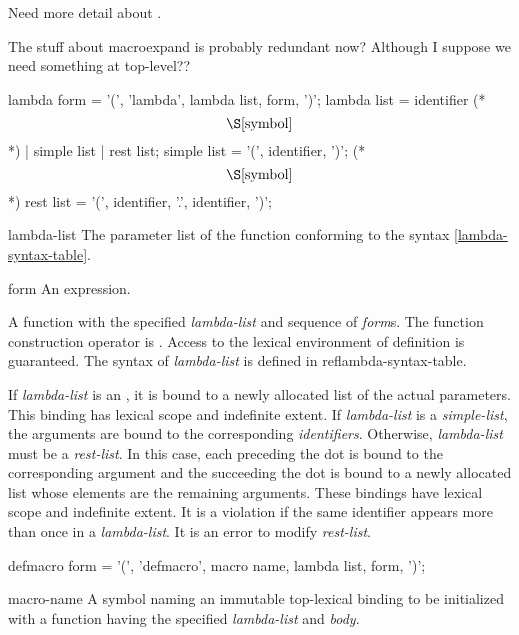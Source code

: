 \label{function}
%
\begin{optPrivate}
    Need more detail about .

    The stuff about macroexpand is probably redundant now?  Although I
    suppose we need something at top-level??
\end{optPrivate}
%
\begin{optDefinition}
%
%
\Syntax
\label{lambda-syntax-table}
\savesyntax\lambdaSyntax\vbox{\syntax
lambda form
   = '(', 'lambda', lambda list, {form}, ')';
lambda list
   = identifier     (* \[\S\ref{symbol}\] *)
   | simple list
   | rest list;
simple list
   = '(', {identifier}, ')';   (* \[\S\ref{symbol}\] *)
rest list
   = '(', {identifier}, '.', identifier, ')';
\endsyntax}
%
\begin{arguments}
    \item[lambda-list] The parameter list of the function conforming to the
    syntax \ref{lambda-syntax-table}.
    \item[form] An expression.
\end{arguments}
%
\result%
A function with the specified {\em lambda-list\/} and sequence of {\em
form\/}s.
%
\remarks%
The function construction operator is .  Access to the
lexical environment of definition is guaranteed.  The syntax of {\em
    lambda-list} is defined in ref{lambda-syntax-table}.

If {\em lambda-list} is an \identifier, it is bound to a newly allocated
list of the actual parameters.  This binding has lexical scope and indefinite extent.  If
{\em lambda-list} is a {\em simple-list}, the arguments are bound to the
corresponding {\em identifiers}.  Otherwise, {\em lambda-list} must be a {\em
    rest-list}.  In this case, each \identifier{} preceding the dot is bound
to the corresponding argument and the \identifier{} succeeding the dot is
bound to a newly allocated list whose elements are the remaining arguments.
These bindings have lexical scope and indefinite extent.  It is a violation
if the same identifier appears more than once in a {\em lambda-list}.  It is an
error to modify {\em rest-list}.

%
\Syntax
\savesyntax{}\vbox{\syntax
defmacro form
   = '(', 'defmacro', macro name, lambda list,
     {form}, ')';
\endsyntax}
%
\begin{arguments}
    \item[macro-name] A symbol naming an immutable top-lexical binding to be
    initialized with a function having the specified {\em lambda-list} and {\em
        body}.


\end{arguments}
\end{optDefinition}
